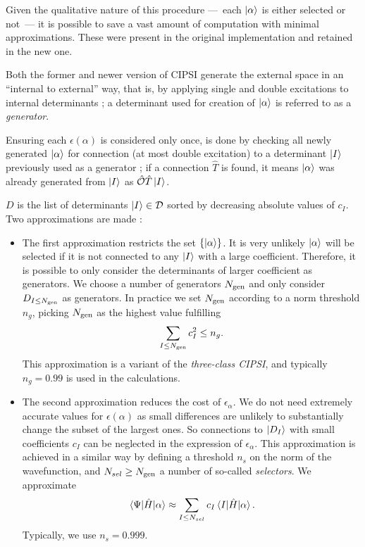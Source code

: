 \documentclass[./thesis.tex]{subfiles}
\begin{document}
Given the qualitative nature of this procedure ---~each ${\ket{\alpha}}$ is either selected or not~--- it is possible to save a vast amount of computation with minimal approximations. These were present in the original implementation and retained in the new one.

Both the former and newer version of CIPSI generate the external space in an ``internal to external'' way, that is, by applying single and double excitations to internal determinants ; a determinant used for creation of ${\ket{\alpha}}$ is referred to as a \emph{generator}.

Ensuring each $\epsilon(\alpha)$ is considered only once, is done by checking all newly generated ${\ket{\alpha}}$ for connection (at most double excitation) to a determinant $\ket {I}$ previously used as a generator ; if a connection $\hat T$ is found, it means ${\ket{\alpha}}$ was already generated from $\ket {I}$ as ${\hat{\mathcal{O}}} \hat T \ket {I}$.

$D$ is the list of determinants ${\ket{I}} \in \mathcal{D}$ sorted by decreasing absolute values of $c_I$. Two approximations are made :

\begin{itemize}
\item
The first approximation restricts the set $\{{\ket{\alpha}}\}$. It is very unlikely $\ket \alpha$ will be selected if it is not connected to any $\ket I$ with a large coefficient. Therefore, it is possible to only consider the determinants of larger coefficient as generators. We choose a number of generators ${N_\text{gen}}$ and only consider $D_{I \leq {N_\text{gen}}}$ as generators. In practice we set ${N_\text{gen}}$ according to a norm threshold $n_g$, picking ${N_\text{gen}}$ as the highest value fulfilling
\begin{equation}
\sum_{I \leq {N_\text{gen}}} c_I^2 \leq n_g.
\end{equation}
This approximation is a variant of the \emph{three-class CIPSI},\cite{Evangelisti_1983}
and typically $n_g=0.99$ is used in the calculations.
\item The second approximation reduces the cost of $\epsilon_\alpha$.
We do not need extremely accurate values for $\epsilon(\alpha)$ as small differences are unlikely to substantially change the subset of the largest ones.
So  connections to $\ket {D_I}$ with small coefficients $c_I$ can be neglected
in the expression of $\epsilon_\alpha$.
This approximation is achieved in a similar way by defining a threshold $n_s$
on the norm of the wavefunction, and $N_{sel} \geq {N_\text{gen}}$ a number of so-called
\emph{selectors}. We approximate 
\begin{equation}
  \mel{\Psi}{\hat{H}}{\alpha} \approx \sum_{I \leq N_{sel}} c_I \mel{I}{\hat{H}}{\alpha}.
\end{equation}
Typically, we use $n_s = 0.999$.

\end{itemize}
\end{document}
